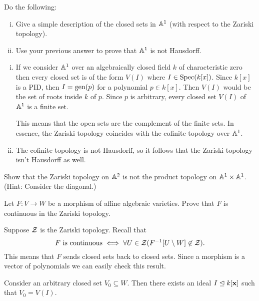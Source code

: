 \documentclass[12pt]{memoir}
\begin{document}

\begin{Ej}
  Do the following:
  \begin{enumerate}[i)]
    \item Give a simple description of the closed sets in $\mathbb{A}^1$ (with respect to the Zariski
    topology).
    \item Use your previous answer to prove that $\mathbb{A}^1$ is not Hausdorff.
  \end{enumerate}
\end{Ej}

\begin{ptcbr}
\begin{enumerate}[i)]
    \item If we consider $\mathbb{A}^1$ over an algebraically closed field $k$ of characteristic zero then every closed set is of the form $V(I)$ where $I\in\operatorname{Spec}(k[x])$. Since $k[x]$ is a PID, then $I=\operatorname{gen}(p)$ for a polynomial $p\in k[x]$. Then $V(I)$ would be the set of roots inside $k$ of $p$. Since $p$ is arbitrary, every closed set $V(I)$ of $\mathbb{A}^1$ is a finite set.\par 
    This means that the open sets are the complement of the finite sets. In essence, the Zariski topology coincides with the cofinite topology over $\mathbb{A}^1$.
    \item The cofinite topology is not Hausdorff, so it follows that the Zariski topology isn't Hausdorff as well.
\end{enumerate}
\end{ptcbr}

\begin{Ej}
  Show that the Zariski topology on $\mathbb{A}^2$ is not the product topology on $\mathbb{A}^1\times\mathbb{A}^1$. (Hint: Consider the diagonal.)
\end{Ej}

\begin{Ej}
  Let $F:V\to W$ be a morphism of affine algebraic varieties.
 Prove that $F$ is continuous in the Zariski topology. 
\end{Ej}

\begin{ptcbr}
  Suppose $\mathcal{Z}$ is the Zariski topology. Recall that
  $$F \text{ is continuous}\iff \forall U\in\mathcal{Z}(F^{-1}[U\setminus W]\not\in\mathcal{Z}).$$
  This means that $F$ sends closed sets back to closed sets. Since a morphism is a vector of polynomials we can easily check this result.\par 
  Consider an arbitrary closed set $V_0\subseteq W$. Then there exists an ideal $I\trianglelefteq k[\mathbf{x}]$ such that $V_0=V(I)$.
\end{ptcbr}
\end{document}
